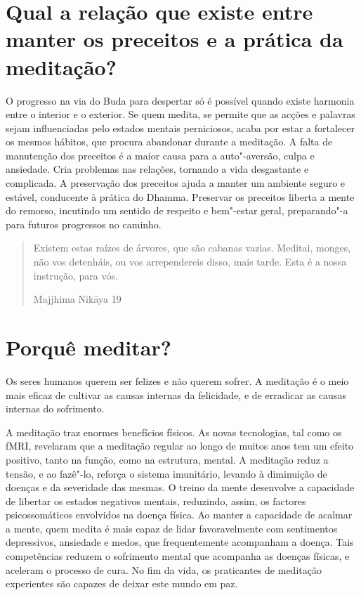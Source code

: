 \section{Qual a relação que existe entre manter os preceitos e a prática da
  meditação?}

O progresso na via do Buda para despertar só é possível quando existe
harmonia entre o interior e o exterior. Se quem medita, se permite que
as acções e palavras sejam influenciadas pelo estados mentais
perniciosos, acaba por estar a fortalecer os mesmos hábitos, que procura
abandonar durante a meditação. A falta de manutenção dos preceitos é a
maior causa para a auto"-aversão, culpa e ansiedade. Cria problemas nas
relações, tornando a vida desgastante e complicada. A preservação dos
preceitos ajuda a manter um ambiente seguro e estável, conducente à
prática do Dhamma. Preservar os preceitos liberta a mente do remorso,
incutindo um sentido de respeito e bem"-estar geral, preparando"-a para
futuros progressos no caminho.

\clearpage\thispagestyle{empty}\mbox{}%

\clearpage
{}

\begin{verse}
  Existem estas raízes de árvores, que são cabanas vazias. Meditai, monges, não
  vos detenháis, ou vos arrependereis disso, mais tarde. Esta é a nossa
  instrução, para vós.

  Majjhima Nikāya 19
\end{verse}

\section{Porquê meditar?}

Os seres humanos querem ser felizes e não querem sofrer. A meditação é o
meio mais eficaz de cultivar as causas internas da felicidade, e de
erradicar as causas internas do sofrimento.

A meditação traz enormes benefícios físicos. As novas tecnologias, tal
como os fMRI, revelaram que a meditação regular ao longo de muitos anos
tem um efeito positivo, tanto na função, como na estrutura, mental. A
meditação reduz a tensão, e ao fazê"-lo, reforça o sistema imunitário,
levando à diminuição de doenças e da severidade das mesmas. O treino da
mente desenvolve a capacidade de libertar os estados negativos mentais,
reduzindo, assim, os factores psicossomáticos envolvidos na doença
física. Ao manter a capacidade de acalmar a mente, quem medita é mais
capaz de lidar favoravelmente com sentimentos depressivos, ansiedade e
medos, que frequentemente acompanham a doença. Tais competências reduzem
o sofrimento mental que acompanha as doenças físicas, e aceleram o
processo de cura. No fim da vida, os praticantes de meditação
experientes são capazes de deixar este mundo em paz.

